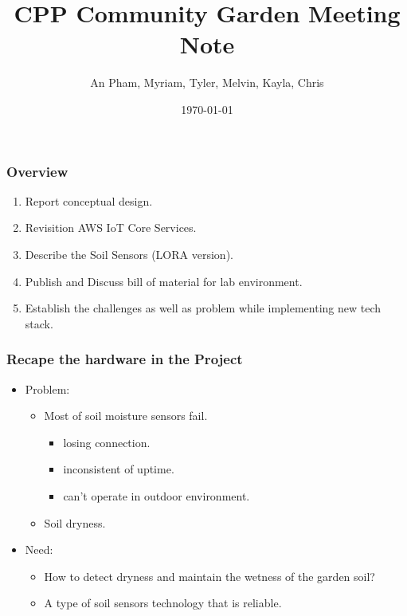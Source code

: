 \documentclass{beamer}
\title{CPP Community Garden Meeting Note}
\author{An Pham, Myriam, Tyler, Melvin, Kayla, Chris}
\institute{Calpoly Pomona}
\date{\today}
\begin{document}
\frame{\titlepage}

\begin{frame}
\frametitle{Overview}
\begin{enumerate}
  \item Report conceptual design.
  \item Revisition AWS IoT Core Services.
  \item Describe the Soil Sensors (LORA version).
  \item Publish and Discuss bill of material for lab environment.
  \item Establish the challenges as well as problem while implementing new tech stack.
 \end{enumerate}
\end{frame}

\begin{frame}
 \frametitle{Recape the hardware in the Project}
   \begin{itemize}
    \item Problem:
      \begin{itemize}
       \item Most of soil moisture sensors fail.
       \begin{itemize}
         \item losing connection.
	 \item inconsistent of uptime.
	 \item can't operate in outdoor environment.
       \end{itemize}
       \item Soil dryness.
      \end{itemize}
    \item Need: 
    \begin{itemize}
      \item How to detect dryness and maintain the wetness of the garden soil?
      \item A type of soil sensors technology that is reliable.
    \end{itemize}
   \end{itemize}
\end{frame}
\end{document}
